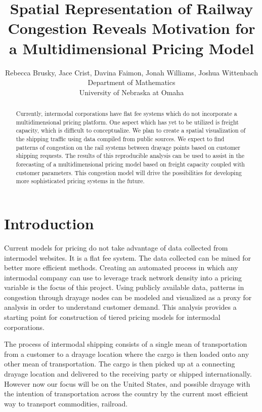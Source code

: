 \documentclass{article}\usepackage[]{graphicx}\usepackage[]{color}
\begin{document}
\title {Spatial Representation of Railway Congestion Reveals Motivation for a Multidimensional Pricing Model}
\author{Rebecca Brusky, Jace Crist, Davina Faimon, Jonah Williams, Joshua Wittenbach\\ Department of Mathematics\\ University of Nebraska at Omaha }

\maketitle



\begin{abstract}Currently, intermodal corporations have flat fee systems which do not incorporate a multidimensional pricing platform. One aspect which has yet to be utilized is freight capacity, which is difficult to conceptualize.  We plan to create a spatial visualization of the shipping traffic using data compiled from public sources.  We expect to find patterns of congestion on the rail systems between drayage points based on customer shipping requests. The results of this reproducible analysis can be used to assist in the forecasting of a multidimensional pricing model based on freight capacity coupled with customer parameters.  This congestion model will drive the possibilities for developing more sophisticated pricing systems in the future.
\end{abstract}


\section{Introduction} Current models for pricing do not take advantage of data collected from intermodel websites. It is a flat fee system. The data collected can be mined for better more efficient methods.  Creating an automated process in which any intermodal company can use to leverage track network density into a pricing variable is the focus of this project. Using publicly available data, patterns in congestion through drayage nodes can be modeled and visualized as a proxy for analysis in order to understand customer demand.  This analysis provides a starting point for construction of tiered pricing models for intermodal corporations.

The process of intermodal shipping consists of a single mean of transportation from a customer to a drayage location where the cargo is then loaded onto any other mean of transportation.  The cargo is then picked up at a connecting drayage location and delivered to the receiving party or shipped internationally. However now our focus will be on the United States, and possible drayage with the intention of transportation across the country by the current most efficient way to transport commodities, railroad.
\end{document}
